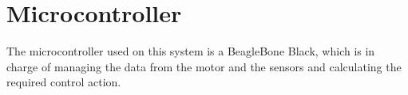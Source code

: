 \section{Microcontroller}

The microcontroller used on this system is a BeagleBone Black, which is in charge of managing the data from the motor and the sensors and calculating the required control action.
